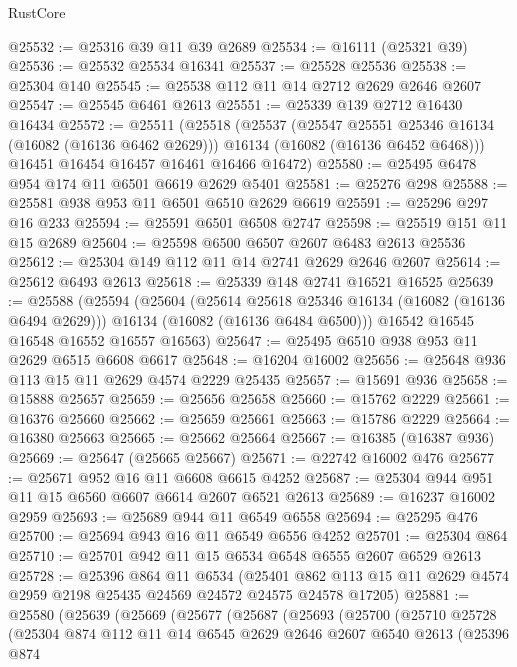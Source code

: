 \begin{lexlean}{RustCore}
\begin{coremodule}
@25532 := @25316 @39 @11 @39 @2689
@25534 := @16111 (@25321 @39)
@25536 := @25532 @25534 @16341
@25537 := @25528 @25536
@25538 := @25304 @140
@25545 := @25538 @112 @11 @14 @2712 @2629 @2646 @2607
@25547 := @25545 @6461 @2613
@25551 := @25339 @139 @2712 @16430 @16434
@25572 := @25511
    (@25518
      (@25537
        (@25547 @25551 @25346 @16134 (@16082 (@16136 @6462 @2629)))
        @16134
        (@16082 (@16136 @6452 @6468)))
      @16451
      @16454
      @16457
      @16461
      @16466
      @16472)
@25580 := @25495 @6478 @954 @174 @11 @6501 @6619 @2629 @5401
@25581 := @25276 @298
@25588 := @25581 @938 @953 @11 @6501 @6510 @2629 @6619
@25591 := @25296 @297 @16 @233
@25594 := @25591 @6501 @6508 @2747
@25598 := @25519 @151 @11 @15 @2689
@25604 := @25598 @6500 @6507 @2607 @6483 @2613 @25536
@25612 := @25304 @149 @112 @11 @14 @2741 @2629 @2646 @2607
@25614 := @25612 @6493 @2613
@25618 := @25339 @148 @2741 @16521 @16525
@25639 := @25588
    (@25594
      (@25604
        (@25614 @25618 @25346 @16134 (@16082 (@16136 @6494 @2629)))
        @16134
        (@16082 (@16136 @6484 @6500)))
      @16542
      @16545
      @16548
      @16552
      @16557
      @16563)
@25647 := @25495 @6510 @938 @953 @11 @2629 @6515 @6608 @6617
@25648 := @16204 @16002
@25656 := @25648 @936 @113 @15 @11 @2629 @4574 @2229 @25435
@25657 := @15691 @936
@25658 := @15888 @25657
@25659 := @25656 @25658
@25660 := @15762 @2229
@25661 := @16376 @25660
@25662 := @25659 @25661
@25663 := @15786 @2229
@25664 := @16380 @25663
@25665 := @25662 @25664
@25667 := @16385 (@16387 @936)
@25669 := @25647 (@25665 @25667)
@25671 := @22742 @16002 @476
@25677 := @25671 @952 @16 @11 @6608 @6615 @4252
@25687 := @25304 @944 @951 @11 @15 @6560 @6607 @6614 @2607 @6521 @2613
@25689 := @16237 @16002 @2959
@25693 := @25689 @944 @11 @6549 @6558
@25694 := @25295 @476
@25700 := @25694 @943 @16 @11 @6549 @6556 @4252
@25701 := @25304 @864
@25710 := @25701 @942 @11 @15 @6534 @6548 @6555 @2607 @6529 @2613
@25728 := @25396
    @864
    @11
    @6534
    (@25401 @862 @113 @15 @11 @2629 @4574 @2959 @2198 @25435 @24569 @24572 @24575 @24578 @17205)
@25881 := @25580
    (@25639
      (@25669
        (@25677
          (@25687
            (@25693
              (@25700
                (@25710
                  @25728
                  (@25304
                    @874
                    @112
                    @11
                    @14
                    @6545
                    @2629
                    @2646
                    @2607
                    @6540
                    @2613
                    (@25396
                      @874

\end{coremodule}
\end{lexlean}
